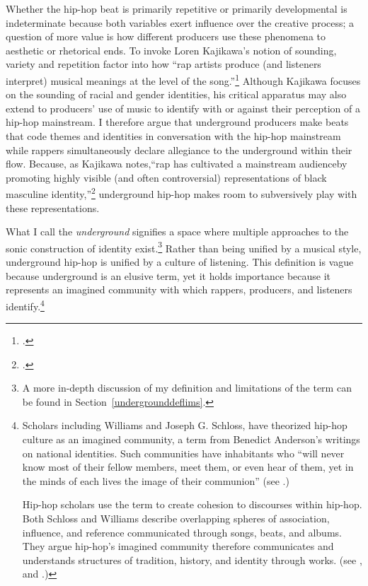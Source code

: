 Whether the hip-hop beat is primarily repetitive or primarily developmental is indeterminate
because both variables exert influence over the creative process; a question of more value is
how different producers use these phenomena to aesthetic or rhetorical ends. To invoke Loren
Kajikawa's notion of sounding, variety and repetition factor into how ``rap artists produce 
(and listeners interpret) musical meanings at the level of the song.''\footnote{
    \autocite[2]{lorenkajikawaSoundingRaceRap2015}.} 
Although Kajikawa focuses on the sounding of racial and gender identities, his critical apparatus
may also extend to producers' use of music to identify with or against their perception of a 
hip-hop mainstream. I therefore argue that underground producers make beats that code themes and
identities in conversation with the hip-hop mainstream while rappers simultaneously declare allegiance
to the underground within their flow. Because, as Kajikawa notes,``rap has cultivated a mainstream
audience\textellipsis by promoting highly visible (and often controversial) representations of 
black masculine identity,''\footnote{
    \autocite[5]{lorenkajikawaSoundingRaceRap2015}.} 
underground hip-hop makes room to subversively play with these representations.

What I call the \emph{underground} signifies a space where multiple approaches to the sonic
construction of identity exist.\footnote{
    A more in-depth discussion of my definition and limitations of the term can be found in 
    Section~\ref{undergrounddeflims}.} 
Rather than being unified by a musical style, underground hip-hop is unified by a culture 
of listening. This definition is vague because underground is an elusive term, yet it holds
importance because it represents an imagined community with which rappers, producers, and
listeners identify.\footnote{
    Scholars including Williams and Joseph G. Schloss, have theorized hip-hop culture as 
    an imagined community, a term from Benedict Anderson's writings on national identities. 
    Such communities have inhabitants who ``will never  know most of their fellow
    members, meet them, or even hear of them, yet in the minds of each lives the image of
    their  communion'' (see \autocite[6]{benedictandersonImaginedCommunitiesReflections2006}.)

    Hip-hop scholars use the term to create cohesion to discourses within hip-hop. Both Schloss 
    and Williams describe overlapping spheres of association, influence, and reference communicated
    through songs, beats, and albums. They argue hip-hop's imagined community therefore communicates
    and understands structures of tradition, history, and identity through works. 
    (see \autocite[4]{josephgschlossMakingBeatsArt2004}, and
    \autocite[12--13]{justinawilliamsRhyminStealinMusical2013}.)}

